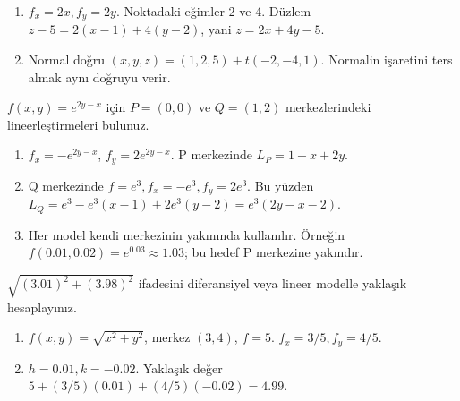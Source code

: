 \begin{tcolorbox}[title={Adım adım çözüm},colback=green!3!white,colframe=green]\begin{enumerate}
\item \(f_x=2x,f_y=2y\). Noktadaki eğimler 2 ve 4. Düzlem \(z-5=2(x-1)+4(y-2)\), yani \(z=2x+4y-5\).
\item Normal doğru \((x,y,z)=(1,2,5)+t(-2,-4,1)\). Normalin işaretini ters almak aynı doğruyu verir.
\end{enumerate}\end{tcolorbox}
\begin{tcolorbox}[title={Örnek 5.6 | Dersteki üstel fonksiyonun iki lineerleştirmesi},colframe=accent]\(f(x,y)=e^{2y-x}\) için \(P=(0,0)\) ve \(Q=(1,2)\) merkezlerindeki lineerleştirmeleri bulunuz.
\par{}\end{tcolorbox}
\begin{tcolorbox}[title={Adım adım çözüm},colback=green!3!white,colframe=green]\begin{enumerate}
\item \(f_x=-e^{2y-x}\), \(f_y=2e^{2y-x}\). P merkezinde \(L_P=1-x+2y\).
\item Q merkezinde \(f=e^3,f_x=-e^3,f_y=2e^3\). Bu yüzden \(L_Q=e^3-e^3(x-1)+2e^3(y-2)=e^3(2y-x-2)\).
\item Her model kendi merkezinin yakınında kullanılır. Örneğin \(f(0.01,0.02)=e^{0.03}\approx1.03\); bu hedef P merkezine yakındır.
\end{enumerate}\end{tcolorbox}
\begin{tcolorbox}[title={Örnek 5.7 | Karekökün yaklaşık değeri},colframe=accent]\(\sqrt{(3.01)^2+(3.98)^2}\) ifadesini diferansiyel veya lineer modelle yaklaşık hesaplayınız.
\par\vspace{1mm}{\scriptsize\sffamily Pekiştirme}\end{tcolorbox}
\begin{tcolorbox}[title={Adım adım çözüm},colback=green!3!white,colframe=green]\begin{enumerate}
\item \(f(x,y)=\sqrt{x^2+y^2}\), merkez \((3,4)\), \(f=5\). \(f_x=3/5,f_y=4/5\).
\item \(h=0.01,k=-0.02\). Yaklaşık değer \(5+(3/5)(0.01)+(4/5)(-0.02)=4.99\).
\end{enumerate}\end{tcolorbox}
